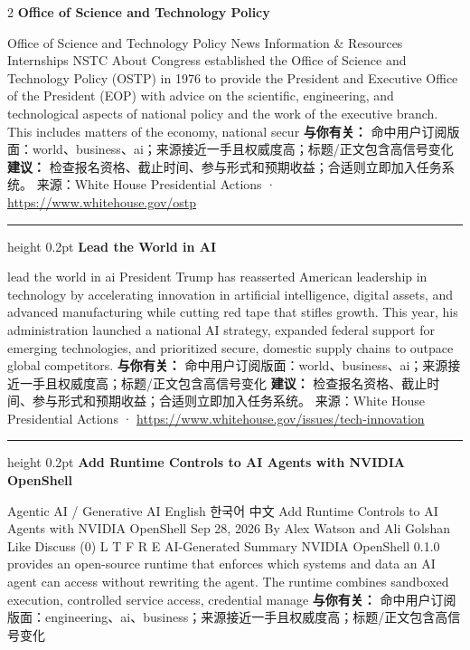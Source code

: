\documentclass[10.5pt]{ctexart}
\begin{document}
\begin{multicols}{2}
{\large\bfseries Office of Science and Technology Policy}\par
Office of Science and Technology Policy News Information \& Resources Internships NSTC About Congress established the Office of Science and Technology Policy (OSTP) in 1976 to provide the President and Executive Office of the President (EOP) with advice on the scientific, engineering, and technological aspects of national policy and the work of the executive branch. This includes matters of the economy, national secur
\textbf{与你有关：} 命中用户订阅版面：world、business、ai；来源接近一手且权威度高；标题/正文包含高信号变化
\textbf{建议：} 检查报名资格、截止时间、参与形式和预期收益；合适则立即加入任务系统。
{\footnotesize\color{ormuted} 来源：White House Presidential Actions · \url{https://www.whitehouse.gov/ostp}}
\vspace{2mm}
\hrule height 0.2pt
\vspace{2mm}
{\large\bfseries Lead the World in AI}\par
lead the world in ai President Trump has reasserted American leadership in technology by accelerating innovation in artificial intelligence, digital assets, and advanced manufacturing while cutting red tape that stifles growth. This year, his administration launched a national AI strategy, expanded federal support for emerging technologies, and prioritized secure, domestic supply chains to outpace global competitors.
\textbf{与你有关：} 命中用户订阅版面：world、business、ai；来源接近一手且权威度高；标题/正文包含高信号变化
\textbf{建议：} 检查报名资格、截止时间、参与形式和预期收益；合适则立即加入任务系统。
{\footnotesize\color{ormuted} 来源：White House Presidential Actions · \url{https://www.whitehouse.gov/issues/tech-innovation}}
\vspace{2mm}
\hrule height 0.2pt
\vspace{2mm}
{\large\bfseries Add Runtime Controls to AI Agents with NVIDIA OpenShell}\par
Agentic AI / Generative AI English 한국어 中文 Add Runtime Controls to AI Agents with NVIDIA OpenShell Sep 28, 2026 By Alex Watson and Ali Golshan Like Discuss (0) L T F R E AI-Generated Summary NVIDIA OpenShell 0.1.0 provides an open-source runtime that enforces which systems and data an AI agent can access without rewriting the agent. The runtime combines sandboxed execution, controlled service access, credential manage
\textbf{与你有关：} 命中用户订阅版面：engineering、ai、business；来源接近一手且权威度高；标题/正文包含高信号变化

\end{multicols}
\end{document}
